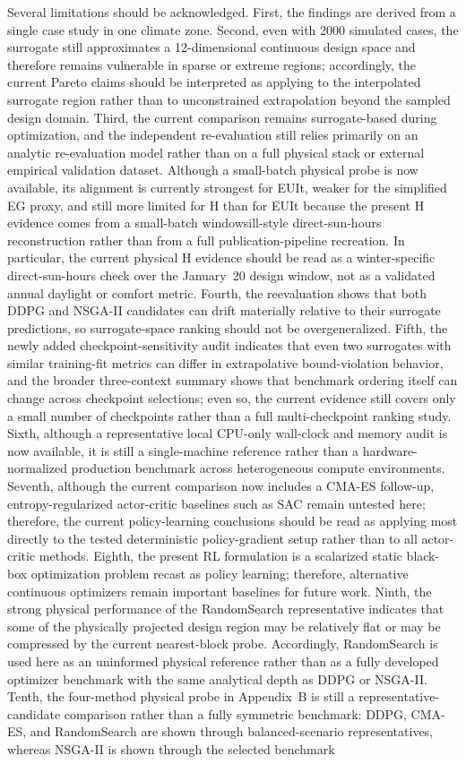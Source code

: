 \documentclass[final,3p,times]{elsarticle}
\begin{document}
Several limitations should be acknowledged. First, the findings are derived from a single case study in one climate zone. Second, even with 2000 simulated cases, the surrogate still approximates a 12-dimensional continuous design space and therefore remains vulnerable in sparse or extreme regions; accordingly, the current Pareto claims should be interpreted as applying to the interpolated surrogate region rather than to unconstrained extrapolation beyond the sampled design domain. Third, the current comparison remains surrogate-based during optimization, and the independent re-evaluation still relies primarily on an analytic re-evaluation model rather than on a full physical stack or external empirical validation dataset. Although a small-batch physical probe is now available, its alignment is currently strongest for EUIt, weaker for the simplified EG proxy, and still more limited for H than for EUIt because the present H evidence comes from a small-batch windowsill-style direct-sun-hours reconstruction rather than from a full publication-pipeline recreation. In particular, the current physical H evidence should be read as a winter-specific direct-sun-hours check over the January~20 design window, not as a validated annual daylight or comfort metric. Fourth, the reevaluation shows that both DDPG and NSGA-II candidates can drift materially relative to their surrogate predictions, so surrogate-space ranking should not be overgeneralized. Fifth, the newly added checkpoint-sensitivity audit indicates that even two surrogates with similar training-fit metrics can differ in extrapolative bound-violation behavior, and the broader three-context summary shows that benchmark ordering itself can change across checkpoint selections; even so, the current evidence still covers only a small number of checkpoints rather than a full multi-checkpoint ranking study. Sixth, although a representative local CPU-only wall-clock and memory audit is now available, it is still a single-machine reference rather than a hardware-normalized production benchmark across heterogeneous compute environments. Seventh, although the current comparison now includes a CMA-ES follow-up, entropy-regularized actor-critic baselines such as SAC remain untested here; therefore, the current policy-learning conclusions should be read as applying most directly to the tested deterministic policy-gradient setup rather than to all actor-critic methods. Eighth, the present RL formulation is a scalarized static black-box optimization problem recast as policy learning; therefore, alternative continuous optimizers remain important baselines for future work. Ninth, the strong physical performance of the RandomSearch representative indicates that some of the physically projected design region may be relatively flat or may be compressed by the current nearest-block probe. Accordingly, RandomSearch is used here as an uninformed physical reference rather than as a fully developed optimizer benchmark with the same analytical depth as DDPG or NSGA-II. Tenth, the four-method physical probe in Appendix~B is still a representative-candidate comparison rather than a fully symmetric benchmark: DDPG, CMA-ES, and RandomSearch are shown through balanced-scenario representatives, whereas NSGA-II is shown through the selected benchmark 
\end{document}
